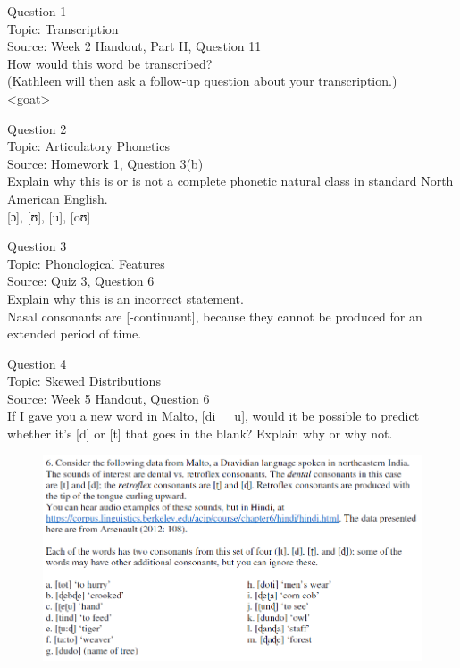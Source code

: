 \documentclass[12pt]{article}
\begin{document}
{\large Question 1}\\

Topic: Transcription\\
Source: Week 2 Handout, Part II, Question 11\\

How would this word be transcribed?\\ (Kathleen will then ask a follow-up question about your transcription.)\\

<goat>


\newpage

{\large Question 2}\\

Topic: Articulatory Phonetics\\
Source: Homework 1, Question 3(b)\\

Explain why this is or is not a complete phonetic natural class in standard North American English.\\

{[ɔ]}, {[ʊ]}, {[u]}, {[oʊ]}


\newpage

{\large Question 3}\\

Topic: Phonological Features\\
Source: Quiz 3, Question 6\\

Explain why this is an incorrect statement.\\

Nasal consonants are {[-continuant]}, because they cannot be produced for an extended period of time.


\newpage

{\large Question 4}\\

Topic: Skewed Distributions\\
Source: Week 5 Handout, Question 6\\

If I gave you a new word in Malto, [di\_\_u], would it be possible to predict whether it's [d] or [t] that goes in the blank? Explain why or why not.\\

\begin{figure}[H]
\includegraphics{../images/malto.png}
\end{figure}
\end{document}
